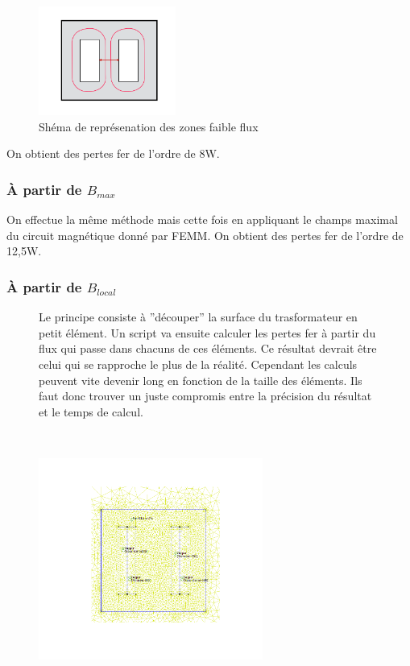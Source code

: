 \begin{figure}[ht]
	\begin{center}
	\includegraphics[width=0.4\textwidth]{images/TP3_repartission_Bmoy}
	\caption{Shéma de représenation des zones faible flux}\label{img:RepChampsBmoy}
	\end{center}
\end{figure}
\FloatBarrier

On obtient des pertes fer de l'ordre de 8W. 


\subsubsection{À partir de $B_{max}$}

On effectue la même méthode mais cette fois en appliquant le champs maximal du circuit magnétique donné par FEMM. On obtient des pertes fer de l'ordre de 12,5W.  


\subsubsection{À partir de $B_{local}$}
\vspace{-10px}
\begin{figure}[ht]
\centering
\begin{minipage}{.5\textwidth}  
Le principe consiste à ''découper'' la surface du trasformateur en petit élément. Un script va ensuite calculer les pertes fer à partir du flux qui passe dans chacuns de ces éléments. Ce résultat devrait être celui qui se rapproche le plus de la réalité. Cependant les calculs peuvent vite devenir long en fonction de la taille des éléments. Ils faut donc trouver un juste compromis entre la précision du résultat et le temps de calcul. 
\end{minipage}~
\begin{minipage}{.5\textwidth}
 \centering
\includegraphics[height=250px]{images/TP3_mesh}  
\end{minipage}
\end{figure}
\FloatBarrier
\vspace{20px}
	



